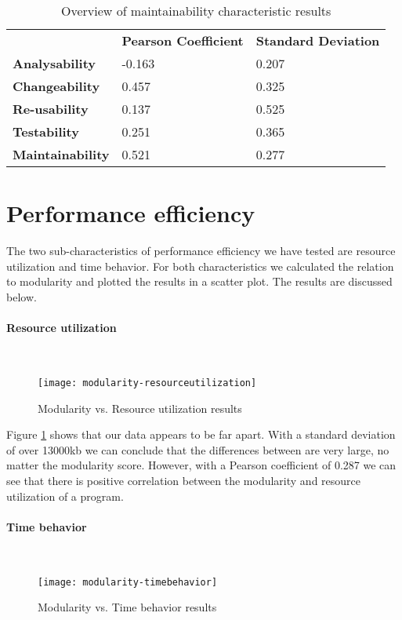 \documentclass[twoside]{uva-inf-bachelor-thesis}
\newcommand{\myparagraph}[1]{\paragraph{#1}\mbox{}\\}
\begin{document}
\begin{table}[H]
\centering
\caption{Overview of maintainability characteristic results}
\label{table:main-overview}
\begin{tabular}{lll}
                         & \textbf{Pearson Coefficient} & \textbf{Standard Deviation} \\
\textbf{Analysability}   & -0.163                       & 0.207                       \\
\textbf{Changeability}   & 0.457                        & 0.325                       \\
\textbf{Re-usability}    & 0.137                        & 0.525                       \\
\textbf{Testability}     & 0.251                        & 0.365                       \\
\textbf{Maintainability} & 0.521                        & 0.277                      
\end{tabular}
\end{table}

\section{Performance efficiency}
The two sub-characteristics of performance efficiency we have tested are resource utilization and time behavior. For both characteristics we calculated the relation to modularity and plotted the results in a scatter plot. The results are discussed below.

\myparagraph{Resource utilization}
\begin{figure}[H]
    \label{figure:perf-res}
    \caption{Modularity vs. Resource utilization results}
    \centering
        \texttt{[image: modularity-resourceutilization]}
\end{figure}

Figure \ref{figure:perf-res} shows that our data appears to be far apart. With a standard deviation of over 13000kb we can conclude that the differences between are very large, no matter the modularity score. However, with a Pearson coefficient of 0.287 we can see that there is positive correlation between the modularity and resource utilization of a program.

\myparagraph{Time behavior}
\begin{figure}[H]
    \label{figure:perf-time}
    \caption{Modularity vs. Time behavior results}
    \centering
        \texttt{[image: modularity-timebehavior]}
\end{figure}
\end{document}
